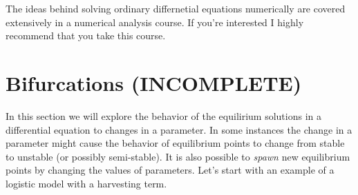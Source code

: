 The ideas behind solving ordinary differnetial equations numerically are covered
extensively in a numerical analysis course.  If you're interested I highly recommend that
you take this course.




\newpage\section{Bifurcations (INCOMPLETE)}
In this section we will explore the behavior of the equilirium solutions in a differential
equation to changes in a parameter.  In some instances the change in a parameter might
cause the behavior of equilibrium points to change from stable to unstable (or possibly
semi-stable).  It is also possible to {\it spawn} new equilibrium points by changing the
values of parameters.  Let's start with an example of a logistic model with a harvesting
term.

